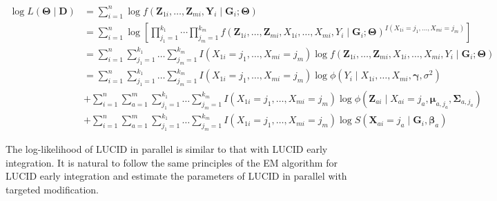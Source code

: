 \begin{equation}
   \begin{aligned}
\log L(\bm{\Theta}\mid \boldsymbol{D}) &  =\sum_{i=1}^{n} \log f\left(\boldsymbol{Z}_{1 i}, \ldots, \boldsymbol{Z}_{m i}, \boldsymbol{Y}_{i} \mid \boldsymbol{G}_{i} ; \boldsymbol{\Theta}\right) \\
& =\sum_{i=1}^{n} \log \left[\prod_{j_{1}=1}^{k_{1}} \cdots \prod_{j_{m}=1}^{k_{m}} f\left(\boldsymbol{Z}_{1 i}, \ldots, \boldsymbol{Z}_{m i}, X_{1 i}, \ldots, X_{m i}, Y_{i} \mid \boldsymbol{G}_{i} ; \boldsymbol{\Theta}\right)^{I\left(X_{1 i}=j_{1}, \ldots, X_{m i}=j_{m}\right)}\right] \\
& =\sum_{i=1}^{n} \sum_{j_{1}=1}^{k_{1}} \ldots \sum_{j_{m}=1}^{k_{m}} I\left(X_{1 i}=j_{1}, \ldots, X_{m i}=j_{m}\right) \log f\left(\boldsymbol{Z}_{1 i}, \ldots, \boldsymbol{Z}_{m i}, X_{1 i}, \ldots, X_{m i}, Y_{i} \mid \boldsymbol{G}_{i} ; \boldsymbol{\Theta}\right) \\
& =\sum_{i=1}^{n} \sum_{j_{1}=1}^{k_{1}} \ldots \sum_{j_{m}=1}^{k_{m}} I\left(X_{1 i}=j_{1}, \ldots, X_{m i}=j_{m}\right) \log \phi\left(Y_{i} \mid X_{1 i}, \ldots, X_{m i}, \boldsymbol{\gamma}, \sigma^{2}\right) \\
& +\sum_{i=1}^{n} \sum_{a=1}^{m} \sum_{j_{1}=1}^{k_{1}} \ldots \sum_{j_{m}=1}^{k_{m}} I\left(X_{1 i}=j_{1}, \ldots, X_{m i}=j_{m}\right) \log \phi\left(\boldsymbol{Z}_{a i} \mid X_{a i}=j_{a}, \boldsymbol{\mu}_{a, j_{a}}, \boldsymbol{\Sigma}_{a, j_{a}}\right) \\
& +\sum_{i=1}^{n} \sum_{a=1}^{m} \sum_{j_{1}=1}^{k_{1}} \ldots \sum_{j_{m}=1}^{k_{m}} I\left(X_{1 i}=j_{1}, \ldots, X_{m i}=j_{m}\right) \log S\left(\boldsymbol{X}_{a i}=j_{a} \mid \boldsymbol{G}_{i}, \boldsymbol{\beta}_{a}\right)
\end{aligned}
    \label{eq_26}
\end{equation}


The log-likelihood of LUCID in parallel is similar to that with LUCID early integration. It is natural to follow the same principles of the EM algorithm for LUCID early integration and estimate the parameters of LUCID in parallel with targeted modification. 

